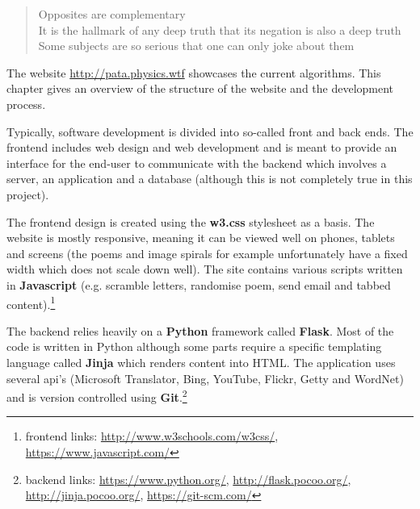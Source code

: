 \begin{quotation}
  Opposites are complementary\\
  It is the hallmark of any deep truth that its negation is also a deep truth\\
  Some subjects are so serious that one can only joke about them
\end{quotation}


The website \url{http://pata.physics.wtf} showcases the current algorithms. This chapter gives an overview of the structure of the website and the development process.


Typically, software development is divided into so-called front and back ends. The frontend includes web design and web development and is meant to provide an interface for the end-user to communicate with the backend which involves a server, an application and a database (although this is not completely true in this project).

The frontend design is created using the \textbf{w3.css} stylesheet as a basis. The website is mostly responsive, meaning it can be viewed well on phones, tablets and screens (the poems and image spirals for example unfortunately have a fixed width which does not scale down well). The site contains various scripts written in \textbf{Javascript} (e.g. scramble letters, randomise poem, send email and tabbed content).\footnote{frontend links: \url{http://www.w3schools.com/w3css/}, \url{https://www.javascript.com/}}

The backend relies heavily on a \textbf{Python} framework called \textbf{Flask}. Most of the code is written in Python although some parts require a specific templating language called \textbf{Jinja} which renders content into HTML. The application uses several \acrshort{api}'s (Microsoft Translator, Bing, YouTube, Flickr, Getty and WordNet) and is version controlled using \textbf{Git}.\footnote{backend links: \url{https://www.python.org/}, \url{http://flask.pocoo.org/}, \url{http://jinja.pocoo.org/}, \url{https://git-scm.com/}}

